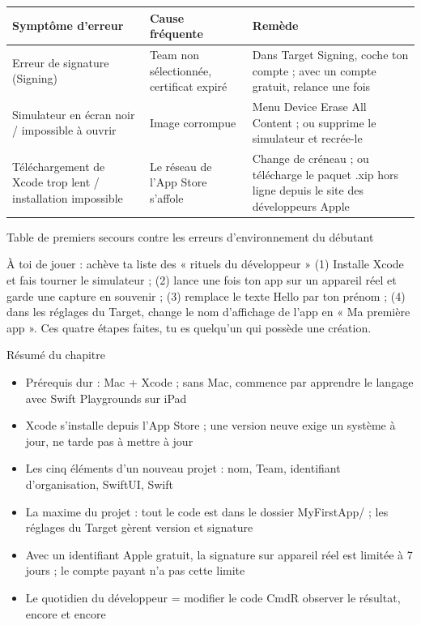 \begin{center}
\begin{tabularx}{\linewidth}{|X|X|X|}
\hline
\textbf{Symptôme d’erreur} & \textbf{Cause fréquente} & \textbf{Remède} \tabularnewline
\hline
Erreur de signature (Signing) & Team non sélectionnée, certificat expiré & Dans Target Signing, coche ton compte ; avec un compte gratuit, relance une fois \tabularnewline
Simulateur en écran noir / impossible à ouvrir & Image corrompue & Menu Device Erase All Content ; ou supprime le simulateur et recrée-le \tabularnewline
Téléchargement de Xcode trop lent / installation impossible & Le réseau de l’App Store s’affole & Change de créneau ; ou télécharge le paquet .xip hors ligne depuis le site des développeurs Apple \tabularnewline
\hline
\end{tabularx}
\end{center}

\begin{center}\small\color{gray}Table de premiers secours contre les erreurs d’environnement du débutant\end{center}

\begin{tcbpractice}{À toi de jouer : achève ta liste des « rituels du développeur »}
(1) Installe Xcode et fais tourner le simulateur ; (2) lance une fois ton app sur un appareil réel et garde une capture en souvenir ; (3) remplace le texte Hello par ton prénom ; (4) dans les réglages du Target, change le nom d’affichage de l’app en « Ma première app ». Ces quatre étapes faites, tu es quelqu’un qui possède une création.

\end{tcbpractice}

\begin{tcbsummary}{Résumé du chapitre}
\begin{itemize}
  \item Prérequis dur : Mac + Xcode ; sans Mac, commence par apprendre le langage avec Swift Playgrounds sur iPad
  \item Xcode s’installe depuis l’App Store ; une version neuve exige un système à jour, ne tarde pas à mettre à jour
  \item Les cinq éléments d’un nouveau projet : nom, Team, identifiant d’organisation, SwiftUI, Swift
  \item La maxime du projet : tout le code est dans le dossier MyFirstApp/ ; les réglages du Target gèrent version et signature
  \item Avec un identifiant Apple gratuit, la signature sur appareil réel est limitée à 7 jours ; le compte payant n’a pas cette limite
  \item Le quotidien du développeur = modifier le code CmdR observer le résultat, encore et encore
\end{itemize}

\end{tcbsummary}
